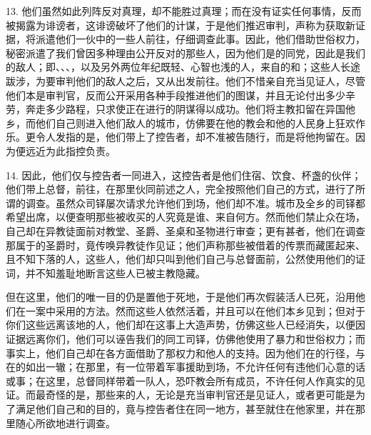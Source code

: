 13. 他们虽然如此列阵反对真理，却不能胜过真理；而在没有证实任何事情，反而被揭露为诽谤者，这诽谤破坏了他们的计谋，于是他们推迟审判，声称为获取新证据，将派遣他们一伙中的一些人前往，仔细调查此事。因此，他们借助世俗权力，秘密派遣了我们曾因多种理由公开反对的那些人，因为他们是的同党，因此是我们的敌人；即、、、，以及另外两位年纪既轻、心智也浅的人，来自的和；这些人长途跋涉，为要审判他们的敌人之后，又从出发前往。他们不惜亲自充当见证人，尽管他们本是审判官，反而公开采用各种手段推进他们的图谋，并且无论付出多少辛劳，奔走多少路程，只求使正在进行的阴谋得以成功。他们将主教扣留在异国他乡，而他们自己则进入他们敌人的城市，仿佛要在他的教会和他的人民身上狂欢作乐。更令人发指的是，他们带上了控告者，却不准被告随行，而是将他拘留在。因为便远近为此指控负责。\par

14. 因此，他们仅与控告者一同进入，这控告者是他们住宿、饮食、杯盏的伙伴；他们带上总督，前往，在那里伙同前述之人，完全按照他们自己的方式，进行了所谓的调查。虽然众司铎屡次请求允许他们到场，他们却不准。城市及全乡的司铎都希望出席，以便查明那些被收买的人究竟是谁、来自何方。然而他们禁止众在场，自己却在异教徒面前对教堂、圣爵、圣桌和圣物进行审查；更有甚者，他们在调查那属于的圣爵时，竟传唤异教徒作见证；他们声称那些被借着的传票而藏匿起来、且不知下落的人，这些人，他们却只叫到他们自己与总督面前，公然使用他们的证词，并不知羞耻地断言这些人已被主教隐藏。\par

但在这里，他们的唯一目的仍是置他于死地，于是他们再次假装活人已死，沿用他们在一案中采用的方法。然而这些人依然活着，并且可以在他们本乡见到；但对于你们这些远离该地的人，他们却在这事上大造声势，仿佛这些人已经消失，以便因证据远离你们，他们可以诬告我们的同工司铎，仿佛他使用了暴力和世俗权力；而事实上，他们自己却在各方面借助了那权力和他人的支持。因为他们在的行径，与在的如出一辙；在那里，有一位带着军事援助到场，不允许任何有违他们心意的话或事；在这里，总督同样带着一队人，恐吓教会所有成员，不许任何人作真实的见证。而最奇怪的是，那些来的人，无论是充当审判官还是见证人，或者更可能是为了满足他们自己和的目的，竟与控告者住在同一地方，甚至就住在他家里，并在那里随心所欲地进行调查。\par

